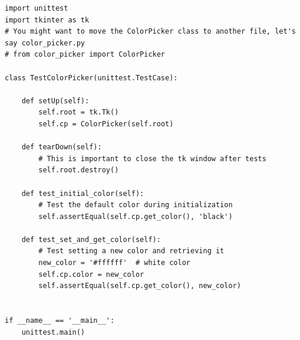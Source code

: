 \begin{tcolorbox}
[title={\textbf{\small Generated Unit tests (test.py)}}, 
colback=whitesmoke, colframe=royalblue(web), boxrule=2pt, arc=0mm]
{\scriptsize
\begin{lstlisting}[style=mystyle]
import unittest
import tkinter as tk
# You might want to move the ColorPicker class to another file, let's say color_picker.py
# from color_picker import ColorPicker

class TestColorPicker(unittest.TestCase):

    def setUp(self):
        self.root = tk.Tk()
        self.cp = ColorPicker(self.root)

    def tearDown(self):
        # This is important to close the tk window after tests
        self.root.destroy()

    def test_initial_color(self):
        # Test the default color during initialization
        self.assertEqual(self.cp.get_color(), 'black')

    def test_set_and_get_color(self):
        # Test setting a new color and retrieving it
        new_color = '#ffffff'  # white color
        self.cp.color = new_color
        self.assertEqual(self.cp.get_color(), new_color)


if __name__ == '__main__':
    unittest.main()
\end{lstlisting}
}
\end{tcolorbox}



